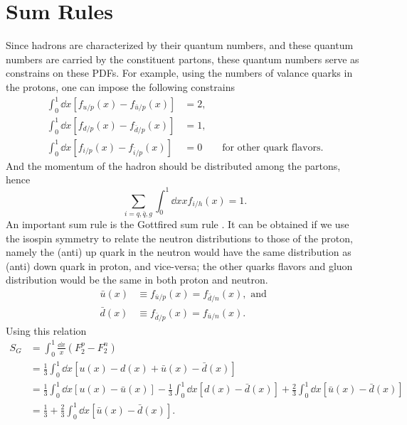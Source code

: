 \documentclass[../main.tex]{subfiles}
\begin{document}
\section{Sum Rules}
\label{sec:sum_rules}
Since hadrons are characterized by their quantum numbers, and these quantum numbers
are carried by the constituent partons, these quantum numbers serve as constrains
on these PDFs. For example, using the numbers of valance quarks in the protons,
one can impose the following constrains
\begin{equation}
	\begin{split}
		\int_{0}^{1} \dd{x} \left[f_{u/p} \left(x\right)-f_{\bar{u}/p} \left(x\right)\right]&=2,\\
		\int_{0}^{1} \dd{x} \left[f_{d/p} \left(x\right)-f_{\bar{d}/p} \left(x\right)\right]&=1,\\
		\int_{0}^{1} \dd{x} \left[f_{i/p} \left(x\right)-f_{\bar{i}/p} \left(x\right)\right]&=0 \qquad \text{for other quark flavors}.
	\end{split}
\end{equation}
And the momentum of the hadron should be distributed among the partons, hence
\begin{equation}
	\sum_{i=q,\bar{q},g}\int_{0}^{1} \dd{x} xf_{i/h}\left(x\right)=1.
\end{equation}
An important sum rule is the Gottfired sum rule \cite{gottfried1967}. It can be obtained
if we use the isospin symmetry to relate the neutron distributions to those of
the proton, namely the (anti) up quark in the neutron would have the same distribution
as (anti) down quark in proton, and vice-versa; the other quarks flavors and gluon
distribution would be the same in both proton and neutron. 
\begin{equation}
\begin{split}
\bar{u}(x) &\equiv f_{\bar{u}/p}(x) = f_{\bar{d}/n}(x),\text{ and }\\
\bar{d}(x) &\equiv f_{\bar{d}/p}(x) = f_{\bar{u}/n}(x).
\end{split}
\end{equation}
Using this relation
\begin{equation}
	\begin{split}
		S_G & = \int_0^1 \frac{\dd{x}}{x}\left(F_2^{p} - F_{2}^{n}\right)\\
		& = \frac{1}{3} \int_0^1 \dd{x} \left[u\left(x\right) - d\left(x\right)
			+ \bar{u}\left(x\right) - \bar{d}\left(x\right)\right]\\
		& = \frac{1}{3} \int_0^1 \dd{x} \left[u\left(x\right) - \bar{u}\left(x\right)\right]
		- \frac{1}{3} \int_0^1 \dd{x} \left[d\left(x\right) - \bar{d}\left(x\right)\right]
		+ \frac{2}{3} \int_0^1 \dd{x} \left[\bar{u}\left(x\right)-\bar{d}\left(x\right)\right]\\
		& = \frac{1}{3} + \frac{2}{3} \int_0^1 \dd{x} \left[\bar{u}\left(x\right)-\bar{d}\left(x\right)\right].
	\end{split}
\end{equation}
\end{document}
